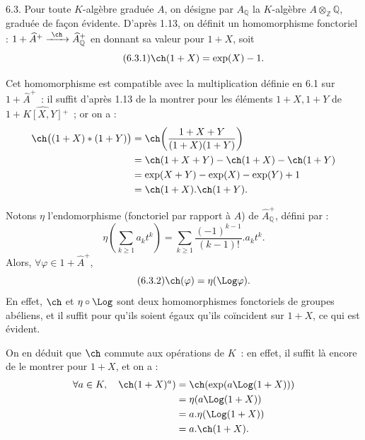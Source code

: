 
6.3.
Pour toute \(K\)-algèbre graduée \(A\), on désigne par \(A_{\mathbb Q}\) la \(K\)-algèbre \(A\otimes_{\mathbb Z}\mathbb Q\), graduée de façon évidente. D'après 1.13, on définit un homomorphisme fonctoriel : \(1+\widehat A^+\xrightarrow{\ \ch\ }\widehat A_{\mathbb Q}^{+}\) en donnant sa valeur pour \(1+X\), soit
\begin{equation}\tag{6.3.1}
  \ch(1+X)=\exp(X)-1.
\end{equation}

Cet homomorphisme est compatible avec la multiplication définie en 6.1 sur \(1+\widehat A^+\)~: il suffit d'après 1.13 de la montrer pour les éléments \(1+X,1+Y\) de \(1+\widehat{K[X,Y]}{}^{+}\)~; or on a :
\[
\begin{aligned}
 \ch\bigl((1+X)*(1+Y)\bigr)
 &= \ch\!\left(\frac{1+X+Y}{(1+X)(1+Y)}\right)\\
 &= \ch(1+X+Y)-\ch(1+X)-\ch(1+Y)\\
 &= \exp(X+Y)-\exp(X)-\exp(Y)+1\\
 &= \ch(1+X).\ch(1+Y).
\end{aligned}
\]

Notons \(\eta\) l'endomorphisme (fonctoriel par rapport à \(A\)) de \(\widehat A_{\mathbb Q}^{+}\), défini par :
\[
 \eta\!\left(\sum_{k\ge1} a_k t^k\right)
 =
 \sum_{k\ge1}\frac{(-1)^{k-1}}{(k-1)!}.a_k t^k.
\]
Alors, \(\forall\varphi\in1+\widehat A^+\),
\begin{equation}\tag{6.3.2}
  \ch(\varphi)=\eta(\Log\varphi).
\end{equation}
En effet, \(\ch\) et \(\eta\circ\Log\) sont deux homomorphismes fonctoriels de groupes abéliens, et il suffit pour qu'ils soient égaux qu'ils coïncident sur \(1+X\), ce qui est évident.

On en déduit que \(\ch\) commute aux opérations de \(K\)~: en effet, il suffit là encore de le montrer pour \(1+X\), et on a :
\[
\begin{aligned}
 \forall a\in K,\quad\ch(1+X)^a)
 &=\ch(\exp(a\Log(1+X)))\\
 &=\eta(a\Log(1+X))\\
 &=a.\eta(\Log(1+X))\\
 &=a.\ch(1+X).
\end{aligned}
\]
